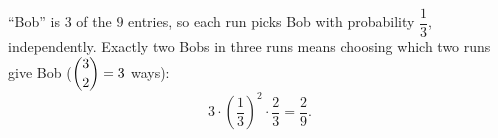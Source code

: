 ``Bob'' is $3$ of the $9$ entries, so each run picks Bob with probability $\dfrac{1}{3}$, independently. Exactly two Bobs in three runs means choosing which two runs give Bob ($\dbinom32=3$ ways):
\[
3\cdot\left(\dfrac{1}{3}\right)^2\cdot\dfrac{2}{3}=\boxed{\dfrac{2}{9}}.
\]

